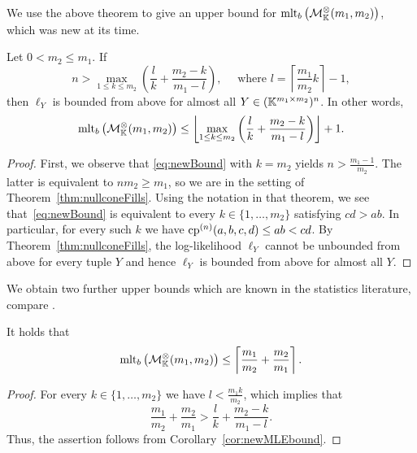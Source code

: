 We use the above theorem to give an upper bound for $\operatorname{mlt}_b\big( \mathcal{M}^{\otimes}_{\mathbb{K}}(m_1,m_2) \big)$, which was new at its time.

\begin{cor}
	\label{cor:newMLEbound}
	Let $0 < m_2 \leq m_1$.  If 
	\begin{equation}
		\label{eq:newBound}
		n > \max_{1\leq k \leq m_2} \left(\frac{l}{k} + \frac{m_2-k}{m_1 - l}\right), \quad \text{ where } l = \left\lceil \frac{m_1}{m_2} k \right\rceil - 1,
	\end{equation}
	then $\ell_Y$ is bounded from above for almost all $Y \in (\mathbb K^{m_1 \times m_2})^n$. In other words,
		\[ \operatorname{mlt}_b \big( \mathcal{M}^{\otimes}_{\mathbb{K}}(m_1,m_2) \big) \leq \left\lfloor \max \limits_{1\leq k \leq m_2} \left(\frac{l}{k} + \frac{m_2-k}{m_1 - l}\right) \right\rfloor +1 . \]
\end{cor}

\begin{proof}
	First, we observe that \eqref{eq:newBound} with $k=m_2$ yields
	$n > \frac{m_1-1}{m_2}$. 
	The latter is equivalent to $nm_2 \geq m_1$, so we are in the setting of Theorem~\ref{thm:nullconeFills}.
	Using the notation in that theorem, we see that~\eqref{eq:newBound} is equivalent to every $k \in \{1, \ldots, m_2 \}$ satisfying
	$cd > ab$.
	In particular, for every such $k$ we have
	$\operatorname{cp}^{(n)}(a,b,c,d) \leq ab < cd$.
	By Theorem~\ref{thm:nullconeFills}, the log-likelihood $\ell_Y$ cannot be unbounded from above for every tuple $Y$ and hence $\ell_Y$ is bounded from above for almost all $Y$.
\end{proof}

We obtain two further upper bounds which are known in the statistics literature, compare \cite[Proposition~1.3, Theorem~1.4]{DrtonKurikiHoff}.

\begin{cor}
	\label{cor:newMLEboundWeaker}
	It holds that
		\[ \operatorname{mlt}_b \big( \mathcal{M}^{\otimes}_{\mathbb{K}}(m_1,m_2) \big) \leq \left\lceil \frac{m_1}{m_2} + \frac{m_2}{m_1} \right\rceil .\]
\end{cor}

\begin{proof}
	For every $k \in \{1, \ldots, m_2 \}$ we have $l < \frac{m_1k}{m_2}$, which implies that
	\begin{equation*}
		\frac{m_1}{m_2} + \frac{m_2}{m_1} > 
		\frac{l}{k} + \frac{m_2-k}{m_1-l}.
	\end{equation*}
	Thus, the assertion follows from Corollary~\ref{cor:newMLEbound}.
\end{proof}

